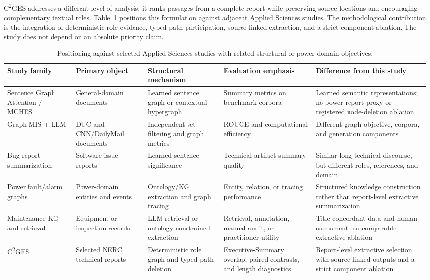 \documentclass[applsci,article,submit,moreauthors]{Definitions/mdpi}
\newcommand{\cges}{C\textsuperscript{2}GES}
\begin{document}
\cges{} addresses a different level of analysis: it ranks passages from a complete report while preserving source locations and encouraging complementary textual roles. Table~\ref{tab:related-comparison} positions this formulation against adjacent Applied Sciences studies. The methodological contribution is the integration of deterministic role evidence, typed-path participation, source-linked extraction, and a strict component ablation. The study does not depend on an absolute priority claim.

\begin{table}[H]
\caption{Positioning against selected Applied Sciences studies with related structural or power-domain objectives.}
\label{tab:related-comparison}\centering\scriptsize
\begin{tabularx}{\textwidth}{p{2.5cm}p{2.4cm}p{2.5cm}p{2.5cm}X}
\toprule
Study family & Primary object & Structural mechanism & Evaluation emphasis & Difference from this study\\
\midrule
Sentence Graph Attention / MCHES \cite{siragusa2022sentencegraph,onan2024mches} & General-domain documents & Learned sentence graph or contextual hypergraph & Summary metrics on benchmark corpora & Learned semantic representations; no power-report proxy or registered node-deletion ablation\\
Graph MIS + LLM \cite{hark2025mis} & DUC and CNN/DailyMail documents & Independent-set filtering and graph metrics & ROUGE and computational efficiency & Different graph objective, corpora, and generation components\\
Bug-report summarization \cite{koh2022bugreport} & Software issue reports & Learned sentence significance & Technical-artifact summary quality & Similar long technical discourse, but different roles, references, and domain\\
Power fault/alarm graphs \cite{liu2022powerfault,ma2025alarm} & Power-domain entities and events & Ontology/KG extraction and graph tracing & Entity, relation, or tracing performance & Structured knowledge construction rather than report-level extractive summarization\\
Maintenance KG and retrieval \cite{cao2024coalmaintenance,zgg2026bridge} & Equipment or inspection records & LLM retrieval or ontology-constrained extraction & Retrieval, annotation, manual audit, or practitioner utility & Title-concordant data and human assessment; no comparable extractive ablation\\
\cges{} & Selected NERC technical reports & Deterministic role graph and typed-path deletion & Executive-Summary overlap, paired contrasts, and length diagnostics & Report-level extractive selection with source-linked outputs and a strict component ablation\\
\bottomrule
\end{tabularx}
\end{table}
\end{document}
